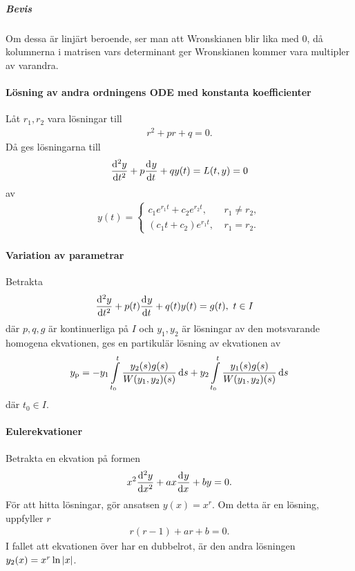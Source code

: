 \subparagraph{Bevis}
Om dessa är linjärt beroende, ser man att Wronskianen blir lika med $0$, då kolumnerna i matrisen vars determinant ger Wronskianen kommer vara multipler av varandra.

\paragraph{Lösning av andra ordningens ODE med konstanta koefficienter}
Låt $r_1, r_2$ vara lösningar till
\begin{align*}
	r^2 + pr + q = 0.
\end{align*}
Då ges lösningarna till
\begin{align*}
	\dv[2]{y}{t} (t) + p\dv[]{y}{t} (t) + qy(t) = L(t, y) = 0
\end{align*}
av
\begin{align*}
	y(t) = 
	\begin{cases}
		c_1e^{r_1t} + c_2e^{r_2t},\ &r_1\neq r_2, \\
		(c_1t + c_2)e^{r_1t},\      &r_1 = r_2.
	\end{cases}
\end{align*}

\paragraph{Variation av parametrar}
Betrakta
\begin{align*}
	\deval[2]{y}{t}{t} + p(t)\deval{y}{t}{t} + q(t)y(t) &= g(t),\ t\in I
\end{align*}
där $p, q, g$ är kontinuerliga på $I$ och $y_{1}, y_{2}$ är lösningar av den motsvarande homogena ekvationen, ges en partikulär lösning av ekvationen av
\begin{align*}
	y_{\text{p}} = -y_{1}\int\limits_{t_{0}}^{t}\frac{y_{2}(s)g(s)}{W(y_{1}, y_{2})(s)}\dd{s} + y_{2}\int\limits_{t_{0}}^{t}\frac{y_{1}(s)g(s)}{W(y_{1}, y_{2})(s)}\dd{s}
\end{align*}
där $t_{0}\in I$.

\paragraph{Eulerekvationer}
Betrakta en ekvation på formen
\begin{align*}
	x^{2}\dv[2]{y}{x} (x) + ax\dv[]{y}{x} (x) + by = 0.
\end{align*}
För att hitta lösningar, gör ansatsen $y(x) = x^{r}$. Om detta är en lösning, uppfyller $r$
\begin{align*}
	r(r - 1) + ar + b = 0.
\end{align*}
I fallet att ekvationen över har en dubbelrot, är den andra lösningen $y_{2}(x) = x^{r}\ln{\abs{x}}$.